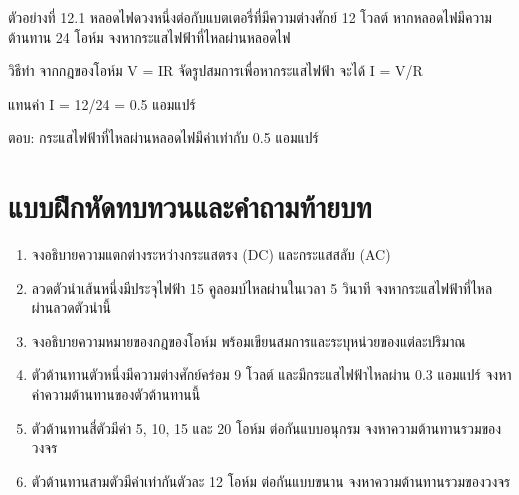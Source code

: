 \begin{examplebox}
ตัวอย่างที่ 12.1 หลอดไฟดวงหนึ่งต่อกับแบตเตอรี่ที่มีความต่างศักย์ 12 โวลต์ หากหลอดไฟมีความต้านทาน 24 โอห์ม จงหากระแสไฟฟ้าที่ไหลผ่านหลอดไฟ

วิธีทำ จากกฎของโอห์ม V = IR จัดรูปสมการเพื่อหากระแสไฟฟ้า จะได้ I = V/R

แทนค่า I = 12/24 = 0.5 แอมแปร์

ตอบ: กระแสไฟฟ้าที่ไหลผ่านหลอดไฟมีค่าเท่ากับ 0.5 แอมแปร์
\end{examplebox}

\section{แบบฝึกหัดทบทวนและคำถามท้ายบท}

\begin{enumerate}
    \item จงอธิบายความแตกต่างระหว่างกระแสตรง (DC) และกระแสสลับ (AC)
    \item ลวดตัวนำเส้นหนึ่งมีประจุไฟฟ้า 15 คูลอมบ์ไหลผ่านในเวลา 5 วินาที จงหากระแสไฟฟ้าที่ไหลผ่านลวดตัวนำนี้
    \item จงอธิบายความหมายของกฎของโอห์ม พร้อมเขียนสมการและระบุหน่วยของแต่ละปริมาณ
    \item ตัวต้านทานตัวหนึ่งมีความต่างศักย์คร่อม 9 โวลต์ และมีกระแสไฟฟ้าไหลผ่าน 0.3 แอมแปร์ จงหาค่าความต้านทานของตัวต้านทานนี้
    \item ตัวต้านทานสี่ตัวมีค่า 5, 10, 15 และ 20 โอห์ม ต่อกันแบบอนุกรม จงหาความต้านทานรวมของวงจร
    \item ตัวต้านทานสามตัวมีค่าเท่ากันตัวละ 12 โอห์ม ต่อกันแบบขนาน จงหาความต้านทานรวมของวงจร
\end{enumerate}

